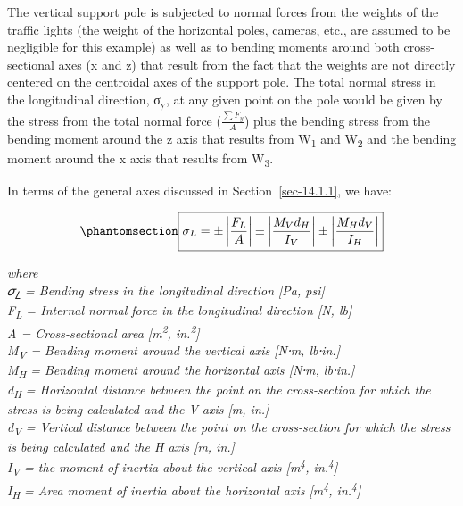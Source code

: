 \documentclass[
  letterpaper,
  DIV=11,
  numbers=noendperiod]{scrreprt}
\theoremstyle{definition}
\theoremstyle{remark}
\begin{document}
The vertical support pole is subjected to normal forces from the weights
of the traffic lights (the weight of the horizontal poles, cameras,
etc., are assumed to be negligible for this example) as well as to
bending moments around both cross-sectional axes (x and z) that result
from the fact that the weights are not directly centered on the
centroidal axes of the support pole. The total normal stress in the
longitudinal direction, σ\textsubscript{y}, at any given point on the
pole would be given by the stress from the total normal force
(\(\frac{\sum F_y}{A}\)) plus the bending stress from the bending moment
around the z axis that results from W\textsubscript{1} and
W\textsubscript{2} and the bending moment around the x axis that results
from W\textsubscript{3}.

In terms of the general axes discussed in Section~\ref{sec-14.1.1}, we
have:

\begin{equation}\phantomsection\label{eq-14.2}{
\boxed{\sigma_L= \pm\left|\frac{F_L}{A}\right| \pm\left|\frac{M_V d_H}{I_V}\right| \pm\left|\frac{M_H d_V}{I_H}\right|}
}\end{equation}

\emph{where}\\
\emph{𝜎\textsubscript{𝐿} = Bending stress in the longitudinal direction
{[}Pa, psi{]}}\\
\emph{F\textsubscript{L} = Internal normal force in the longitudinal
direction {[}N, lb{]}}\\
\emph{A = Cross-sectional area {[}m\textsuperscript{2},
in.\textsuperscript{2}{]}}\\
\emph{M\textsubscript{V} = Bending moment around the vertical axis
{[}N⸱m, lb⸱in.{]}}\\
\emph{M\textsubscript{H} = Bending moment around the horizontal axis
{[}N⸱m, lb⸱in.{]}}\\
\emph{d\textsubscript{H} = Horizontal distance between the point on the
cross-section for which the stress is being calculated and the V axis
{[}m, in.{]}}\\
\emph{d\textsubscript{V} = Vertical distance between the point on the
cross-section for which the stress is being calculated and the H axis
{[}m, in.{]}}\\
\emph{I\textsubscript{V} = the moment of inertia about the vertical axis
{[}m\textsuperscript{4}, in.\textsuperscript{4}{]}}\\
\emph{I\textsubscript{H} = Area moment of inertia about the horizontal
axis {[}m\textsuperscript{4}, in.\textsuperscript{4}{]}}
\end{document}
